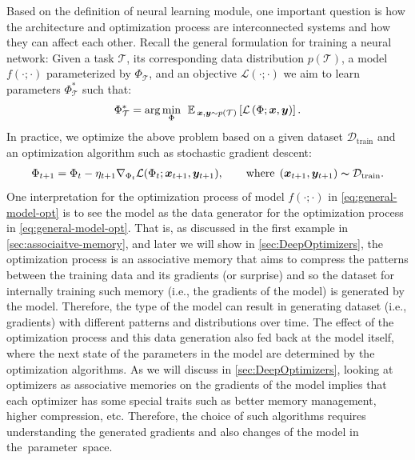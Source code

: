 Based on the definition of neural learning module, one important question is how the architecture and optimization process are interconnected systems and how they can affect each other. Recall the general formulation for training a neural network: Given a task $\mathcal{T}$, its corresponding data distribution $p(\mathcal{T})$, a model $f(\cdot; \cdot)$ parameterized by $\Phi_{\mathcal{T}}$, and an objective $\mathcal{L}(\cdot; \cdot)$ we aim to learn parameters $\Phi^{*}_{\mathcal{T}}$ such that:
\begin{align}
    \Phi^{*}_{\mathcal{T}} = \arg \min_{\Phi}\: \:\mathbb{E}_{\:\boldsymbol{x}, \boldsymbol{y} \sim p(\mathcal{T})} \left[ \mathcal{L}\left(\Phi; \boldsymbol{x}, \boldsymbol{y}\right) \right].
\end{align}
In practice, we optimize the above problem based on a given dataset $\mathcal{D}_{\text{train}}$ and an optimization algorithm such as stochastic gradient descent:
\begin{align}\label{eq:general-model-opt}
    \Phi_{t+1} = \Phi_{t} - \eta_{t+1} \nabla_{\Phi_t} \mathcal{L}(\Phi_t; \boldsymbol{x}_{t+1}, \boldsymbol{y}_{t+1}), \qquad \text{where}\:\: (\boldsymbol{x}_{t+1}, \boldsymbol{y}_{t+1}) \thicksim \mathcal{D}_{\text{train}}.
\end{align}
One interpretation for the optimization process of model $f(\cdot; \cdot)$ in \autoref{eq:general-model-opt} is to see the model as the data generator for the optimization process in \autoref{eq:general-model-opt}. That is, as discussed in the first example in \autoref{sec:associaitve-memory}, and later we will show in \autoref{sec:DeepOptimizers}, the optimization process is an associative memory that aims to compress the patterns between the training data and its gradients (or surprise) and so the dataset for internally training such memory (i.e., the gradients of the model) is generated by the model. Therefore, the type of the model can result in generating dataset (i.e., gradients) with different patterns and distributions over time. The effect of the optimization process and this data generation also fed back at the model itself, where the next state of the parameters in the model are determined by the optimization algorithms. As we will discuss in \autoref{sec:DeepOptimizers}, looking at optimizers as associative memories on the gradients of the model implies that each optimizer has some special traits such as better memory management, higher compression, etc. Therefore, the choice of such algorithms requires understanding the generated gradients and also changes of the model in the~parameter~space. 




